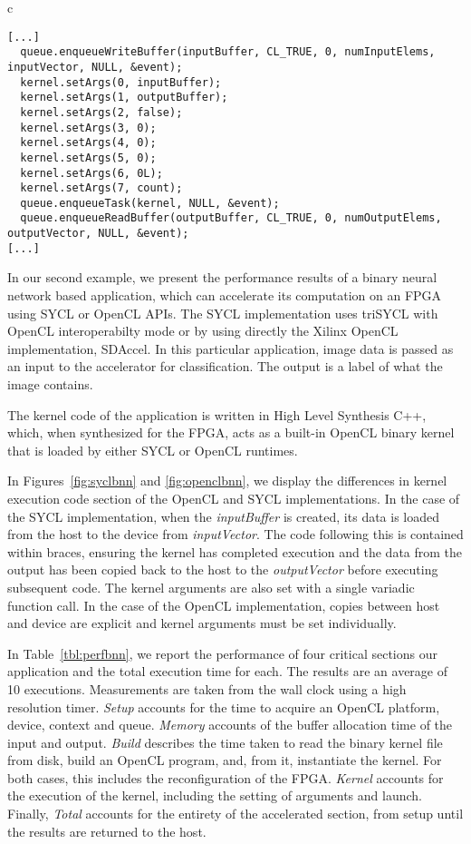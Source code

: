 \documentclass[sigplan]{acmart}
\begin{document}
\begin{figure*}
  \begin{tabular}{c}
    \begin{lstlisting}[basicstyle=\scriptsize]
[...]
  queue.enqueueWriteBuffer(inputBuffer, CL_TRUE, 0, numInputElems, inputVector, NULL, &event);
  kernel.setArgs(0, inputBuffer);
  kernel.setArgs(1, outputBuffer);
  kernel.setArgs(2, false);
  kernel.setArgs(3, 0);
  kernel.setArgs(4, 0);
  kernel.setArgs(5, 0);
  kernel.setArgs(6, 0L);
  kernel.setArgs(7, count);
  queue.enqueueTask(kernel, NULL, &event);
  queue.enqueueReadBuffer(outputBuffer, CL_TRUE, 0, numOutputElems, outputVector, NULL, &event);
[...]
\end{lstlisting}
\end{tabular}
\caption{BNN kernel launch using OpenCL host API.}
\label{fig:openclbnn}
\end{figure*}


In our second example, we present the performance results of a binary
neural network based application, which can accelerate its computation
on an FPGA using SYCL or OpenCL APIs. The SYCL implementation uses
triSYCL with OpenCL interoperabilty mode or by using directly the Xilinx OpenCL implementation, SDAccel. In this particular application, image data is passed as an input to the accelerator for classification. The output is a label of what the image contains.

The kernel code of the application is written in High Level Synthesis
C++, which, when synthesized for the FPGA, acts as a built-in OpenCL
binary kernel that is loaded by either SYCL or OpenCL runtimes.

In Figures~\ref{fig:syclbnn} and \ref{fig:openclbnn}, we display the differences in kernel execution code section of the OpenCL and SYCL implementations. In the case of the SYCL implementation, when the \textit{inputBuffer} is created, its data is loaded from the host to the device from \textit{inputVector}. The code following this is contained within braces, ensuring the kernel has completed execution and the data from the output has been copied back to the host to the \textit{outputVector} before executing subsequent code. The kernel arguments are also set with a single variadic function call. In the case of the OpenCL implementation, copies between host and device are explicit and kernel arguments must be set individually. 

In Table~\ref{tbl:perfbnn}, we report the performance of four critical sections our application and the total execution time for each. The results are an average of 10 executions. Measurements are taken from the wall clock using a high resolution timer. \textit{Setup} accounts for the time to acquire an OpenCL platform, device, context and queue. \textit{Memory} accounts of the buffer allocation time of the input and output. \textit{Build} describes the time taken to read the binary kernel file from disk, build an OpenCL program, and, from it, instantiate the kernel. For both cases, this includes the reconfiguration of the FPGA. \textit{Kernel} accounts for the execution of the kernel, including the setting of arguments and launch. Finally, \textit{Total} accounts for the entirety of the accelerated section, from setup until the results are returned to the host.
\end{document}
